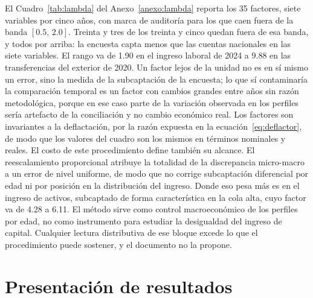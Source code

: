 \documentclass[11pt,a4paper]{article}
\begin{document}
El Cuadro~\ref{tab:lambda} del Anexo~\ref{anexo:lambda} reporta los 35 factores, siete variables
por cinco años, con marca de auditoría para los que caen fuera de la banda $[0.5,\,2.0]$. Treinta
y tres de los treinta y cinco quedan fuera de esa banda, y todos por arriba: la encuesta capta
menos que las cuentas nacionales en las siete variables. El rango va de 1.90 en el ingreso
laboral de 2024 a 9.88 en las transferencias del exterior de 2020. Un factor lejos de la unidad
no es en sí mismo un error, sino la medida de la subcaptación de la encuesta; lo que sí
contaminaría la comparación temporal es un factor con cambios grandes entre años sin razón
metodológica, porque en ese caso parte de la variación observada en los perfiles sería artefacto
de la conciliación y no cambio económico real. Los factores son invariantes a la deflactación,
por la razón expuesta en la ecuación~\eqref{eq:deflactor}, de modo que los valores del cuadro son
los mismos en términos nominales y reales.
El costo de este procedimiento define también su alcance. El reescalamiento proporcional atribuye
la totalidad de la discrepancia micro-macro a un error de nivel uniforme, de modo que no corrige
subcaptación diferencial por edad ni por posición en la distribución del ingreso. Donde eso pesa
más es en el ingreso de activos, subcaptado de forma característica en la cola alta, cuyo factor
va de 4.28 a 6.11. El método sirve como control macroeconómico de los perfiles por edad, no como
instrumento para estudiar la desigualdad del ingreso de capital. Cualquier lectura distributiva
de ese bloque excede lo que el procedimiento puede sostener, y el documento no la propone.
\section{Presentación de resultados}
\label{sec:resultados}
\end{document}
